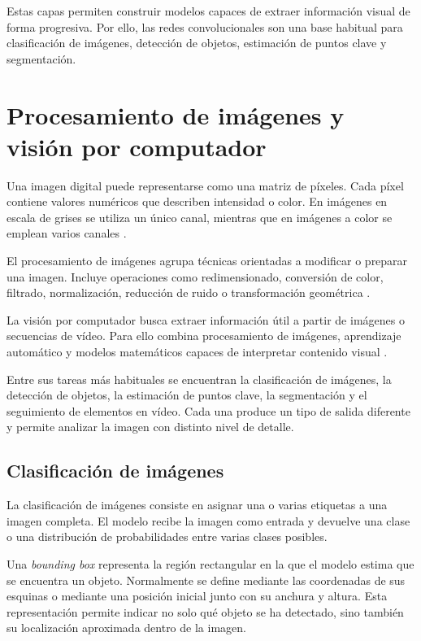 Estas capas permiten construir modelos capaces de extraer información visual de forma progresiva. Por ello, las redes convolucionales son una base habitual para clasificación de imágenes, detección de objetos, estimación de puntos clave y segmentación.

\section{Procesamiento de imágenes y visión por computador}

Una imagen digital puede representarse como una matriz de píxeles. Cada píxel contiene valores numéricos que describen intensidad o color. En imágenes en escala de grises se utiliza un único canal, mientras que en imágenes a color se emplean varios canales \cite{gonzalez2018digital}.

El procesamiento de imágenes agrupa técnicas orientadas a modificar o preparar una imagen. Incluye operaciones como redimensionado, conversión de color, filtrado, normalización, reducción de ruido o transformación geométrica \cite{gonzalez2018digital}.

La visión por computador busca extraer información útil a partir de imágenes o secuencias de vídeo. Para ello combina procesamiento de imágenes, aprendizaje automático y modelos matemáticos capaces de interpretar contenido visual \cite{szeliski2022computer}.

Entre sus tareas más habituales se encuentran la clasificación de imágenes, la detección de objetos, la estimación de puntos clave, la segmentación y el seguimiento de elementos en vídeo. Cada una produce un tipo de salida diferente y permite analizar la imagen con distinto nivel de detalle.

\subsection{Clasificación de imágenes}

La clasificación de imágenes consiste en asignar una o varias etiquetas a una imagen completa. El modelo recibe la imagen como entrada y devuelve una clase o una distribución de probabilidades entre varias clases posibles\cite{bishop2006pattern}.

Una \textit{bounding box} representa la región rectangular en la que el modelo estima que se encuentra un objeto. Normalmente se define mediante las coordenadas de sus esquinas o mediante una posición inicial junto con su anchura y altura. Esta representación permite indicar no solo qué objeto se ha detectado, sino también su localización aproximada dentro de la imagen.

